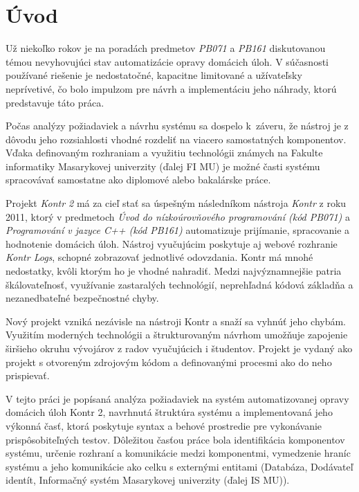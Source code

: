 \documentclass[
  digital, %
  twoside, %
  table,   %
  lof,     %
  lot,     %
]{fithesis3}
\begin{document}
\chapter*{Úvod}


Už niekoľko rokov je na poradách predmetov \textit{PB071} a \textit{PB161} diskutovanou témou nevyhovujúci stav automatizácie opravy domácich úloh. V súčasnosti používané riešenie je nedostatočné, kapacitne limitované a užívateľsky neprívetivé, čo bolo impulzom pre návrh a implementáciu jeho náhrady, ktorú predstavuje táto práca. %

Počas analýzy požiadaviek a návrhu systému sa dospelo k~záveru, že nástroj je z dôvodu jeho rozsiahlosti vhodné rozdeliť na viacero samostatných komponentov. Vďaka definovaným rozhraniam a využitiu technológii známych na Fakulte informatiky Masarykovej univerzity (ďalej FI MU) je možné časti systému spracovávať samostatne ako diplomové alebo bakalárske práce.

Projekt \textit{Kontr 2} má za cieľ stať sa úspešným následníkom nástroja \textit{Kontr}\cite{kontr} z roku 2011, ktorý v predmetoch \emph{Úvod do nízkoúrovňového programování (kód PB071)} a \emph{Programování v jazyce C++ (kód PB161)} automatizuje prijímanie, spracovanie a hodnotenie domácich úloh. Nástroj vyučujúcim poskytuje aj webové rozhranie \textit{Kontr Logs}\cite{KontrWeb}, schopné zobrazovať jednotlivé odovzdania. Kontr má mnohé nedostatky, kvôli ktorým ho je vhodné nahradiť. Medzi najvýznamnejšie patria škálovateľnosť, využívanie zastaralých technológií, neprehľadná kódová základňa a nezanedbateľné bezpečnostné chyby.

Nový projekt vzniká nezávisle na nástroji Kontr a snaží sa vyhnúť jeho chybám. Využitím moderných technológii a štrukturovaným návrhom umožňuje zapojenie širšieho okruhu vývojárov z radov vyučujúcich i študentov. Projekt je vydaný ako projekt s otvoreným zdrojovým kódom a definovanými procesmi ako do neho prispievať.

V tejto práci je popísaná analýza požiadaviek na systém automatizovanej opravy domácich úloh Kontr 2, navrhnutá štruktúra systému a implementovaná jeho výkonná časť, ktorá poskytuje syntax a behové prostredie pre vykonávanie prispôsobiteľných testov. Dôležitou časťou práce bola identifikácia komponentov systému, určenie rozhraní a komunikácie medzi komponentmi, vymedzenie hraníc systému a jeho komunikácie ako celku s externými entitami (Databáza, Dodávateľ identít, Informačný systém Masarykovej univerzity (ďalej IS MU)).
\end{document}
